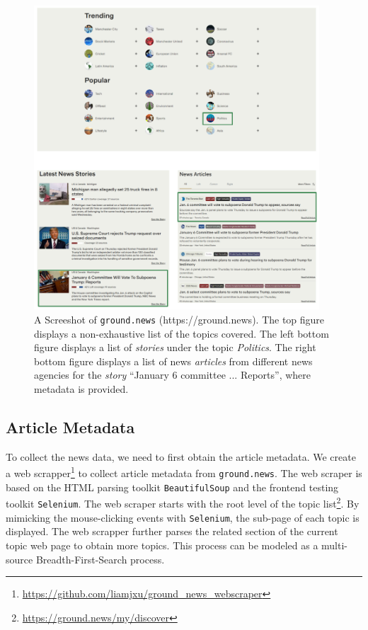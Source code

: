 \begin{figure}[ht!]
    \centering
    \includegraphics[width=0.95\textwidth]{img/ground_news.png}
    \caption{A Screeshot of \texttt{ground.news} (https://ground.news). The top figure displays a non-exhaustive list of the topics covered. The left bottom figure displays a list of \textit{stories} under the topic \textit{Politics}. The right bottom figure displays a list of news \textit{articles} from different news agencies for the \textit{story} ``January 6 committee ... Reports'', where metadata is provided.}
    \label{fig:ground-news}
\end{figure}

\subsection{Article Metadata}
\label{article-metadata}
To collect the news data, we need to first obtain the article metadata. We create a web scrapper\footnote{\url{https://github.com/liamjxu/ground\_news\_webscraper}} to collect article metadata from \texttt{ground.news}. The web scraper is based on the HTML parsing toolkit \texttt{BeautifulSoup} and the frontend testing toolkit \texttt{Selenium}. The web scraper starts with the root level of the topic list\footnote{\url{https://ground.news/my/discover}}. By mimicking the mouse-clicking events with \texttt{Selenium}, the sub-page of each topic is displayed. The web scrapper further parses the related section of the current topic web page to obtain more topics. This process can be modeled as a multi-source Breadth-First-Search process.

